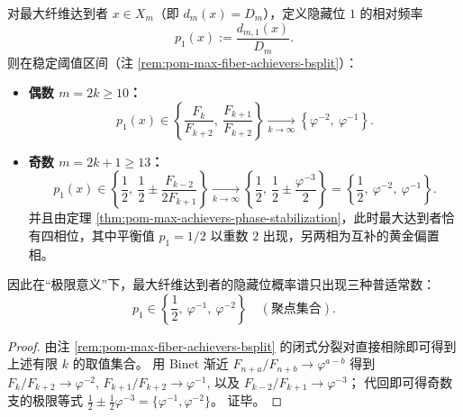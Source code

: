 \begin{corollary}\label{cor:pom-max-fiber-achievers-hidden-bit-prob-spectrum}
对最大纤维达到者 \(x\in X_m\)（即 \(d_m(x)=D_m\)），定义隐藏位 \(1\) 的相对频率
\[
p_1(x):=\frac{d_{m,1}(x)}{D_m}.
\]
则在稳定阈值区间（注 \ref{rem:pom-max-fiber-achievers-bsplit}）：
\begin{itemize}
  \item \textbf{偶数 \(m=2k\ge 10\)：}
  \[
  p_1(x)\in\left\{\frac{F_k}{F_{k+2}},\ \frac{F_{k+1}}{F_{k+2}}\right\}
  \xrightarrow[k\to\infty]{}\left\{\varphi^{-2},\ \varphi^{-1}\right\}.
  \]
  \item \textbf{奇数 \(m=2k+1\ge 13\)：}
  \[
  p_1(x)\in\left\{\frac12,\ \frac12\pm\frac{F_{k-2}}{2F_{k+1}}\right\}
  \xrightarrow[k\to\infty]{}\left\{\frac12,\ \frac12\pm\frac{\varphi^{-3}}{2}\right\}
  =
  \left\{\frac12,\ \varphi^{-2},\ \varphi^{-1}\right\}.
  \]
  并且由定理 \ref{thm:pom-max-achievers-phase-stabilization}，此时最大达到者恰有四相位，其中平衡值 \(p_1=1/2\) 以重数 \(2\) 出现，另两相为互补的黄金偏置相。
\end{itemize}
因此在“极限意义”下，最大纤维达到者的隐藏位概率谱只出现三种普适常数：
\[
\boxed{\;
p_1\in\left\{\frac12,\ \varphi^{-1},\ \varphi^{-2}\right\}\quad(\text{聚点集合}).
\;}
\]
\end{corollary}
\begin{proof}
由注 \ref{rem:pom-max-fiber-achievers-bsplit} 的闭式分裂对直接相除即可得到上述有限 \(k\) 的取值集合。
用 Binet 渐近 \(F_{n+a}/F_{n+b}\to \varphi^{a-b}\) 得到
\(
F_k/F_{k+2}\to\varphi^{-2}
\),
\(
F_{k+1}/F_{k+2}\to\varphi^{-1}
\),
以及
\(
F_{k-2}/F_{k+1}\to\varphi^{-3}
\)；
代回即可得奇数支的极限等式
\(
\tfrac12\pm\tfrac12\varphi^{-3}=\{\varphi^{-1},\varphi^{-2}\}
\)。
证毕。
\end{proof}





